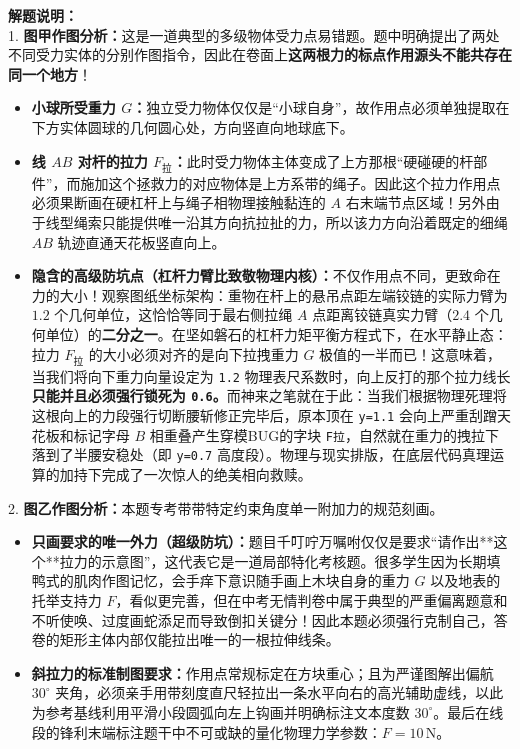 {\small\color{gray}
\textbf{解题说明：}\\
1. \textbf{图甲作图分析：}这是一道典型的多级物体受力点易错题。题中明确提出了两处不同受力实体的分别作图指令，因此在卷面上\textbf{这两根力的标点作用源头不能共存在同一个地方}！
\begin{itemize}
    \item \textbf{小球所受重力 $G$：}独立受力物体仅仅是“小球自身”，故作用点必须单独提取在下方实体圆球的几何圆心处，方向竖直向地球底下。
    \item \textbf{线 $AB$ 对杆的拉力 $F_{\text{拉}}$：}此时受力物体主体变成了上方那根“硬碰硬的杆部件”，而施加这个拯救力的对应物体是上方系带的绳子。因此这个拉力作用点必须果断画在硬杠杆上与绳子相物理接触黏连的 $A$ 右末端节点区域！另外由于线型绳索只能提供唯一沿其方向抗拉扯的力，所以该力方向沿着既定的细绳 $AB$ 轨迹直通天花板竖直向上。
    \item \textbf{隐含的高级防坑点（杠杆力臂比致敬物理内核）：}不仅作用点不同，更致命在力的大小！观察图纸坐标架构：重物在杆上的悬吊点距左端铰链的实际力臂为 $1.2$ 个几何单位，这恰恰等同于最右侧拉绳 $A$ 点距离铰链真实力臂（$2.4$ 个几何单位）的\textbf{二分之一}。在坚如磐石的杠杆力矩平衡方程式下，在水平静止态：拉力 $F_{\text{拉}}$ 的大小必须对齐的是向下拉拽重力 $G$ 极值的一半而已！这意味着，当我们将向下重力向量设定为 \texttt{1.2} 物理表尺系数时，向上反打的那个拉力线长\textbf{只能并且必须强行锁死为 \texttt{0.6}。}而神来之笔就在于此：当我们根据物理死理将这根向上的力段强行切断腰斩修正完毕后，原本顶在 \texttt{y=1.1} 会向上严重刮蹭天花板和标记字母 $B$ 相重叠产生穿模BUG的字块 \texttt{F拉}，自然就在重力的拽拉下落到了半腰安稳处（即 \texttt{y=0.7} 高度段）。物理与现实排版，在底层代码真理运算的加持下完成了一次惊人的绝美相向救赎。
\end{itemize}
2. \textbf{图乙作图分析：}本题专考带带特定约束角度单一附加力的规范刻画。
\begin{itemize}
    \item \textbf{只画要求的唯一外力（超级防坑）：}题目千叮咛万嘱咐仅仅是要求“请作出**这个**拉力的示意图”，这代表它是一道局部特化考核题。很多学生因为长期填鸭式的肌肉作图记忆，会手痒下意识随手画上木块自身的重力 $G$ 以及地表的托举支持力 $F$，看似更完善，但在中考无情判卷中属于典型的严重偏离题意和不听使唤、过度画蛇添足而导致倒扣关键分！因此本题必须强行克制自己，答卷的矩形主体内部仅能拉出唯一的一根拉伸线条。
    \item \textbf{斜拉力的标准制图要求：}作用点常规标定在方块重心；且为严谨图解出偏航 $30^{\circ}$ 夹角，必须亲手用带刻度直尺轻拉出一条水平向右的高光辅助虚线，以此为参考基线利用平滑小段圆弧向左上钩画并明确标注文本度数 $30^{\circ}$。最后在线段的锋利末端标注题干中不可或缺的量化物理力学参数：$F = 10\,\text{N}$。
\end{itemize}
}

